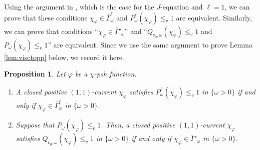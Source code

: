 \documentclass[10pt,a4paper]{amsart}
\numberwithin{equation}{section}
\newtheorem{prop}[equation]{Proposition}
\begin{document}
Using the argument in \cite[Proposition 2.11]{Mur}, which is the case for the $J$-equation and $\ell=1$, we can prove that these conditions $\chi_\varphi\in\bar{\Gamma}^\ell_\omega$ and $P^\ell_\omega(\chi_\varphi)\le_v 1$ are equivalent. Similarly, we can prove that conditions ``$\chi_\varphi\in\bar{\Gamma}'_\omega$'' and ``$Q_{c_0,\omega}(\chi_\varphi)\le_v1$ and $P_\omega(\chi_\varphi)\le_v 1$'' are equivalent.
Since we use the same argument to prove Lemma \ref{lem:visctopp} below, we record it here.
    \begin{prop}\label{prop:equivalence}
    Let $\varphi$ be a $\chi$-psh function.
        \begin{enumerate}[label={\upshape(\roman*)}]
            \item\label{item:eqgammal} A closed positive  $(1,1)$-current $\chi_\varphi$ satisfies $P^\ell_\omega(\chi_\varphi)\le_v 1$ in $\{\omega>0\}$ if and only if $\chi_\varphi \in \bar{\Gamma}^\ell_\omega$ in $\{\omega>0\}$.
            \item\label{item:eqgamma'} Suppose that $P_\omega(\chi_\varphi)\le_v1$. Then, a closed positive  $(1,1)$-current $\chi_\varphi$ satisfies $Q_{c_0,\omega}(\chi_\varphi)\le_v 1$ in $\{\omega>0\}$ if and only if $\chi_\varphi \in \bar{\Gamma}'_\omega$ in $\{\omega>0\}$.
        \end{enumerate}
    \end{prop}
\end{document}
